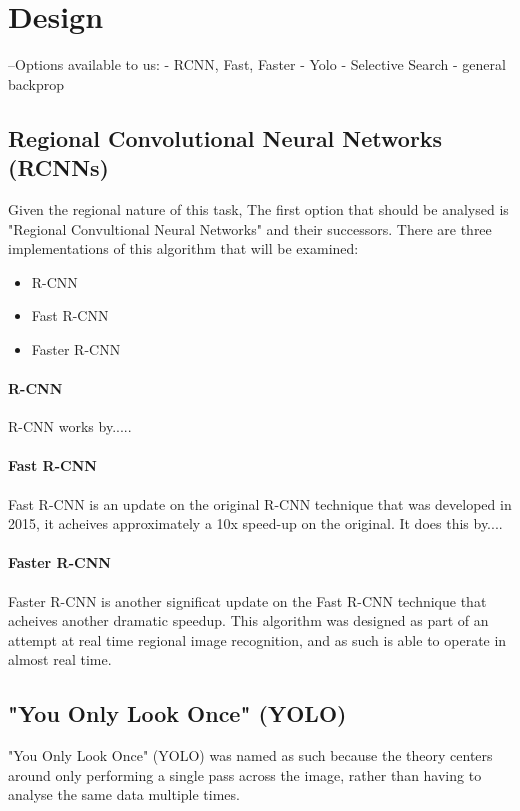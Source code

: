 \documentclass[10pt]{article}
\begin{document}
\section{Design}
--Options available to us:
	- RCNN, Fast, Faster
	- Yolo
	- Selective Search
	- general backprop
	
\subsection{Regional Convolutional Neural Networks (RCNNs)}
	Given the regional nature of this task, The first option that should be analysed is "Regional Convultional Neural Networks" and their successors. There are three implementations of this algorithm that will be examined:
	\begin{itemize}
		\item R-CNN
		\item Fast R-CNN \cite{fast_rcnn}
		\item Faster R-CNN \cite{faster_rcnn}
	\end{itemize}
	
\paragraph{R-CNN}
R-CNN works by.....

\paragraph{Fast R-CNN}
Fast R-CNN \cite{fast_rcnn} is an update on the original R-CNN technique that was developed in 2015, it acheives approximately a 10x speed-up on the original. It does this by....

\paragraph{Faster R-CNN}
Faster R-CNN \cite{faster_rcnn} is another significat update on the Fast R-CNN technique that acheives another dramatic speedup. This algorithm was designed as part of an attempt at real time regional image recognition, and as such is able to operate in almost real time.
	

\subsection{"You Only Look Once" (YOLO)}
"You Only Look Once" (YOLO) was named as such because the theory centers around only performing a single pass across the image, rather than having to analyse the same data multiple times.
\end{document}
